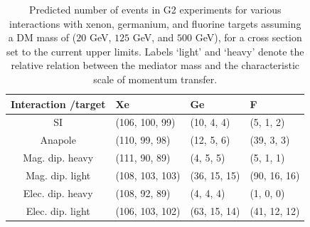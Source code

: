 \documentclass[11pt]{article}
\begin{document}
\begin{table}[t] 
\setlength{\extrarowheight}{3pt}
\setlength{\tabcolsep}{12pt}
\begin{center}
\begin{tabular}{|c||m{3cm}|m{3cm}|m{3cm}|}\hline
Interaction /target & Xe & Ge & F\\
\hline\hline 
SI& (106, 100, 99)& (10, 4, 4)& (5, 1, 2)\\ \hline
Anapole& (110, 99, 98)& (12, 5, 6)& (39, 3, 3)\\ \hline
Mag. dip. heavy& (111, 90, 89)& (4, 5, 5)& (5, 1, 1)\\ \hline
Mag. dip. light& (108, 103, 103)& (36, 15, 15)& (90, 16, 16)\\ \hline
Elec. dip. heavy& (108, 92, 89)& (4, 4, 4)& (1, 0, 0)\\ \hline
Elec. dip. light& (106, 103, 102)& (63, 15, 14)& (41, 12, 12)\\ \hline

\end{tabular}
\end{center}
\caption{Predicted number of events in G2 experiments for various interactions with xenon, germanium, and fluorine targets assuming a DM mass of ($20$ GeV, $125$ GeV, and $500$ GeV), for a cross section set to the current upper limits. Labels `light' and `heavy' denote the relative relation between the mediator mass and the characteristic scale of momentum transfer. }
\label{tab:pred_events}
\end{table}
\end{document}
